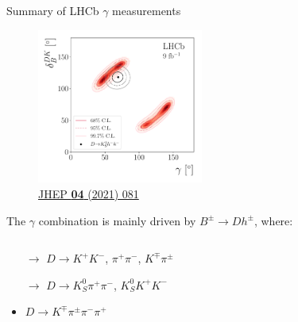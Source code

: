 \documentclass[xcolor={dvipsnames}]{beamer}
\begin{document}
\begin{frame}{Summary of LHCb \texorpdfstring{$\gamma$}{gamma} measurements}
  \begin{figure}
    \includegraphics[height=5.1cm]{Plots/Fig6a_two_body.pdf}
    \vspace{-0.8cm}
    \caption*{\tiny\href{https://link.springer.com/article/10.1007/JHEP04(2021)081}{JHEP \textbf{04} (2021) 081}}
  \end{figure}
  \vspace{-0.8cm}
  \begin{center}
    The $\gamma$ combination is mainly driven by $B^\pm\to Dh^\pm$, where:
  \end{center}
  \vspace{-0.2cm}
  \begin{columns}
    \begin{column}{0.5\textwidth}
      \begin{itemize}
        \setlength\itemsep{0.5em}
        \item[$\rightarrow$]{$D\to K^+K^-$, $\pi^+\pi^-$, $K^\mp\pi^\pm$}
        \item[$\rightarrow$]{$D\to K_S^0\pi^+\pi^-$, $K_S^0K^+K^-$}
        \item{$D\to K^\mp\pi^\pm\pi^-\pi^+$}
      \end{itemize}
    \end{column}
    \begin{column}{0.5\textwidth}
      \begin{itemize}
        \item[]{}
      \end{itemize}
    \end{column}
  \end{columns}
\end{frame}
\end{document}
